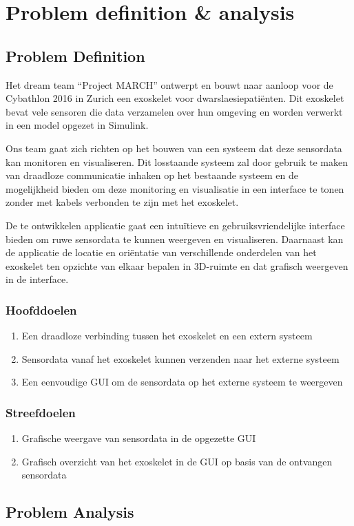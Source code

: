 \section{Problem definition \& analysis}
\subsection{Problem Definition}
Het dream team ``Project MARCH'' ontwerpt en bouwt naar aanloop voor de Cybathlon 2016 in Zurich een exoskelet voor dwarslaesiepatiënten. Dit exoskelet bevat vele sensoren die data verzamelen over hun omgeving en worden verwerkt in een model opgezet in Simulink.

Ons team gaat zich richten op het bouwen van een systeem dat deze sensordata kan monitoren en visualiseren. Dit losstaande systeem zal door gebruik te maken van draadloze communicatie inhaken op het bestaande systeem en de mogelijkheid bieden om deze monitoring en visualisatie in een interface te tonen zonder met kabels verbonden te zijn met het exoskelet.

De te ontwikkelen applicatie gaat een intuïtieve en gebruiksvriendelijke interface bieden om ruwe sensordata te kunnen weergeven en visualiseren. Daarnaast kan de applicatie de locatie en oriëntatie van verschillende onderdelen van het exoskelet ten opzichte van elkaar bepalen in 3D-ruimte en dat grafisch weergeven in de interface.
\subsubsection{Hoofddoelen}
\begin{enumerate}
	\item Een draadloze verbinding tussen het exoskelet en een extern systeem
	\item Sensordata vanaf het exoskelet kunnen verzenden naar het externe systeem
	\item Een eenvoudige GUI om de sensordata op het externe systeem te weergeven
\end{enumerate}
\subsubsection{Streefdoelen}
\begin{enumerate}
	\item Grafische weergave van sensordata in de opgezette GUI
	\item Grafisch overzicht van het exoskelet in de GUI op basis van de ontvangen sensordata
\end{enumerate}

\subsection{Problem Analysis}